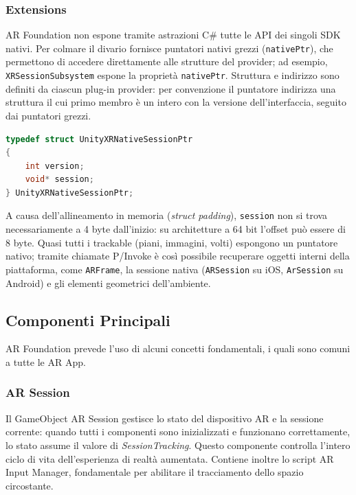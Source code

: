 \subsubsection{Extensions}
AR Foundation non espone tramite astrazioni C\# tutte le API dei singoli SDK nativi. Per colmare il divario fornisce puntatori nativi grezzi (\texttt{nativePtr}), che permettono di accedere direttamente alle strutture del provider; ad esempio, \texttt{XRSessionSubsystem} espone la proprietà \texttt{nativePtr}. Struttura e indirizzo sono definiti da ciascun plug-in provider: per convenzione il puntatore indirizza una struttura il cui primo membro è un intero con la versione dell'interfaccia, seguito dai puntatori grezzi.

\begin{lstlisting}[language=C]
typedef struct UnityXRNativeSessionPtr
{
    int version;
    void* session;
} UnityXRNativeSessionPtr;
\end{lstlisting}

A causa dell'allineamento in memoria (\textit{struct padding}), \texttt{session} non si trova necessariamente a 4 byte dall'inizio: su architetture a 64 bit l'offset può essere di 8 byte. Quasi tutti i trackable (piani, immagini, volti) espongono un puntatore nativo; tramite chiamate P/Invoke è così possibile recuperare oggetti interni della piattaforma, come \texttt{ARFrame}, la sessione nativa (\texttt{ARSession} su iOS, \texttt{ArSession} su Android) e gli elementi geometrici dell'ambiente.



\subsection{Componenti Principali}
AR Foundation\cite{AR-Foundation-3} prevede l'uso di alcuni concetti fondamentali, i quali sono comuni a tutte le AR App.

\subsubsection{AR Session}
Il GameObject AR Session gestisce lo stato del dispositivo AR e la sessione corrente: quando tutti i componenti sono inizializzati e funzionano correttamente, lo stato assume il valore di \textit{SessionTracking}. Questo componente controlla l'intero ciclo di vita dell'esperienza di realtà aumentata.
Contiene inoltre lo script AR Input Manager, fondamentale per abilitare il tracciamento dello spazio circostante.

